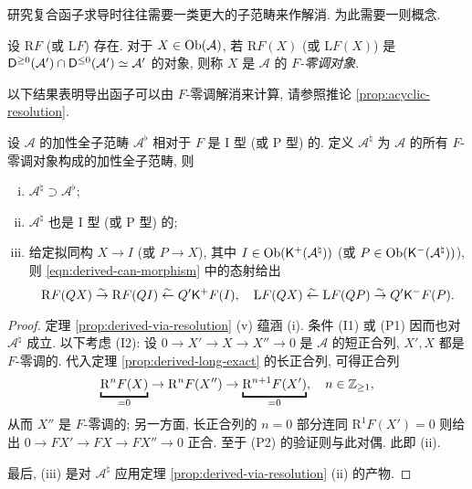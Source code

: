 研究复合函子求导时往往需要一类更大的子范畴来作解消. 为此需要一则概念.

\begin{definition}\label{def:F-acyclic-object}
	设 $\mathrm{R}F$ (或 $\mathrm{L}F$) 存在. 对于 $X \in \operatorname{Ob}(\mathcal{A})$, 若 $\mathrm{R}F(X)$ (或 $\mathrm{L}F(X)$) 是 $\mathsf{D}^{\geq 0}(\mathcal{A}') \cap \mathsf{D}^{\leq 0}(\mathcal{A}') \simeq \mathcal{A}'$ 的对象, 则称 $X$ 是 $\mathcal{A}$ 的 \emph{$F$-零调对象}.
\end{definition}

以下结果表明导出函子可以由 $F$-零调解消来计算, 请参照推论 \ref{prop:acyclic-resolution}.

\begin{corollary}\label{prop:derived-via-F-acyclic}
	设 $\mathcal{A}$ 的加性全子范畴 $\mathcal{A}^\flat$ 相对于 $F$ 是 I 型 (或 P 型) 的. 定义 $\mathcal{A}^\natural$ 为 $\mathcal{A}$ 的所有 $F$-零调对象构成的加性全子范畴, 则
	\begin{enumerate}[(i)]
		\item $\mathcal{A}^\natural \supset \mathcal{A}^\flat$;
		\item $\mathcal{A}^\natural$ 也是 I 型 (或 P 型) 的;
		\item 给定拟同构 $X \to I$ (或 $P \to X$), 其中 $I \in \operatorname{Ob}(\mathsf{K}^+(\mathcal{A}^\natural))$ (或 $P \in \operatorname{Ob}(\mathsf{K}^-(\mathcal{A}^\natural))$), 则 \eqref{eqn:derived-can-morphism} 中的态射给出
		\[ \mathrm{R}F(QX) \stackrel{\sim}{\rightarrow} \mathrm{R}F(QI) \stackrel{\sim}{\leftarrow} Q' \mathsf{K}^+ F(I), \quad \mathrm{L}F(QX) \stackrel{\sim}{\leftarrow} \mathrm{L}F(QP) \stackrel{\sim}{\rightarrow} Q' \mathsf{K}^- F(P). \]
	\end{enumerate}
\end{corollary}
\begin{proof}
	定理 \ref{prop:derived-via-resolution} (v) 蕴涵 (i). 条件 (I1) 或 (P1) 因而也对 $\mathcal{A}^\natural$ 成立. 以下考虑 (I2): 设 $0 \to X' \to X \to X'' \to 0$ 是 $\mathcal{A}$ 的短正合列, $X', X$ 都是 $F$-零调的. 代入定理 \ref{prop:derived-long-exact} 的长正合列, 可得正合列
	\[ \underbracket{\mathrm{R}^n F(X)}_{= 0} \to \mathrm{R}^n F(X'') \to \underbracket{\mathrm{R}^{n+1}F(X')}_{= 0}, \quad n \in \Z_{\geq 1} , \]
	从而 $X''$ 是 $F$-零调的; 另一方面, 长正合列的 $n=0$ 部分连同 $\mathrm{R}^1 F(X') = 0$ 则给出 $0 \to FX' \to FX \to FX'' \to 0$ 正合. 至于 (P2) 的验证则与此对偶. 此即 (ii).
	
	最后, (iii) 是对 $\mathcal{A}^\natural$ 应用定理 \ref{prop:derived-via-resolution} (ii) 的产物.
\end{proof}

